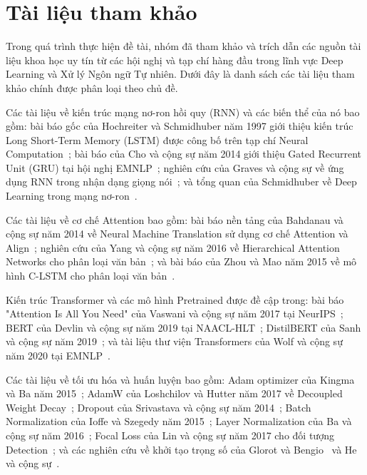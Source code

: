 \documentclass[../BTL.tex]{subfiles}
\begin{document}
\section{Tài liệu tham khảo}

Trong quá trình thực hiện đề tài, nhóm đã tham khảo và trích dẫn các nguồn tài liệu khoa học uy tín từ các hội nghị và tạp chí hàng đầu trong lĩnh vực Deep Learning và Xử lý Ngôn ngữ Tự nhiên. Dưới đây là danh sách các tài liệu tham khảo chính được phân loại theo chủ đề.

Các tài liệu về kiến trúc mạng nơ-ron hồi quy (RNN) và các biến thể của nó bao gồm: bài báo gốc của Hochreiter và Schmidhuber năm 1997 giới thiệu kiến trúc Long Short-Term Memory (LSTM) được công bố trên tạp chí Neural Computation~\cite{hochreiter1997lstm}; bài báo của Cho và cộng sự năm 2014 giới thiệu Gated Recurrent Unit (GRU) tại hội nghị EMNLP~\cite{cho2014gru}; nghiên cứu của Graves và cộng sự về ứng dụng RNN trong nhận dạng giọng nói~\cite{graves2012supervised}; và tổng quan của Schmidhuber về Deep Learning trong mạng nơ-ron~\cite{schmidhuber2015deep}.

Các tài liệu về cơ chế Attention bao gồm: bài báo nền tảng của Bahdanau và cộng sự năm 2014 về Neural Machine Translation sử dụng cơ chế Attention và Align~\cite{bahdanau2014attention}; nghiên cứu của Yang và cộng sự năm 2016 về Hierarchical Attention Networks cho phân loại văn bản~\cite{yang2016hierarchical}; và bài báo của Zhou và Mao năm 2015 về mô hình C-LSTM cho phân loại văn bản~\cite{zhou2015attentionrcnn}.

Kiến trúc Transformer và các mô hình Pretrained được đề cập trong: bài báo "Attention Is All You Need" của Vaswani và cộng sự năm 2017 tại NeurIPS~\cite{vaswani2017transformer}; BERT của Devlin và cộng sự năm 2019 tại NAACL-HLT~\cite{devlin2019bert}; DistilBERT của Sanh và cộng sự năm 2019~\cite{sanh2019distilbert}; và tài liệu thư viện Transformers của Wolf và cộng sự năm 2020 tại EMNLP~\cite{wolf2020transformers}.

Các tài liệu về tối ưu hóa và huấn luyện bao gồm: Adam optimizer của Kingma và Ba năm 2015~\cite{kingma2015adam}; AdamW của Loshchilov và Hutter năm 2017 về Decoupled Weight Decay~\cite{loshchilov2017adamw}; Dropout của Srivastava và cộng sự năm 2014~\cite{srivastava2014dropout}; Batch Normalization của Ioffe và Szegedy năm 2015~\cite{ioffe2015batch}; Layer Normalization của Ba và cộng sự năm 2016~\cite{ba2016layer}; Focal Loss của Lin và cộng sự năm 2017 cho đối tượng Detection~\cite{lin2017focal}; và các nghiên cứu về khởi tạo trọng số của Glorot và Bengio~\cite{glorot2010deep} và He và cộng sự~\cite{he2015delving}.
\end{document}
